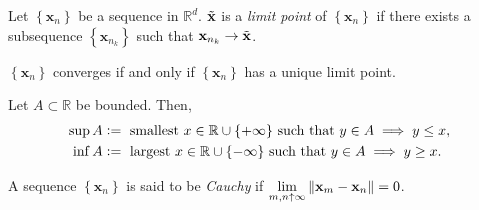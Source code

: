 \begin{defn}
    Let $\left\{ \mathbf{x}_n \right\}$ be a sequence in $\mathbb{R}^d$. $\Tilde{\mathbf{x}}$ is a \emph{limit point} of $\left\{ \mathbf{x}_n \right\}$ if there exists a subsequence $\left\{ \mathbf{x}_{n_k} \right\}$ such that $\mathbf{x}_{n_k} \to \Tilde{\mathbf{x}}$.
\end{defn}

\begin{prop}
    $\left\{ \mathbf{x}_n \right\}$ converges if and only if $\left\{ \mathbf{x}_n \right\}$ has a unique limit point.    
\end{prop}

\begin{defn}
    Let $A \subset \mathbb{R}$ be bounded. Then, 
    \begin{align*}
        \sup A &\vcentcolon= \text{ smallest } x \in \mathbb{R} \cup \{+\infty\} \text{ such that } y \in A \implies y \leq x, \\
        \inf A &\vcentcolon= \text{ largest } x \in \mathbb{R} \cup \{-\infty\} \text{ such that } y \in A \implies y \geq x.
    \end{align*}
\end{defn}

\begin{defn}
    A sequence $\left\{ \mathbf{x}_n \right\}$ is said to be \emph{Cauchy} if $\displaystyle\lim_{m,n \uparrow \infty} \norm{\mathbf{x}_m - \mathbf{x}_n} = 0$.
\end{defn}

